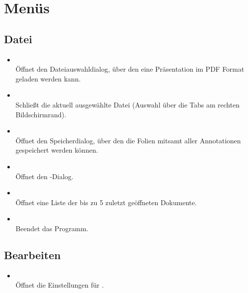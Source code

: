 \section{Menüs}
\subsection{Datei}
\begin{itemize}
\item {}\\Öffnet den Dateiauswahldialog, über den eine Präsentation im PDF Format geladen werden kann.
\item {}\\Schließt die aktuell ausgewählte Datei (Auswahl über die Tabs am rechten Bildschirmrand).
\item {}\\Öffnet den Speicherdialog, über den die Folien mitsamt aller Annotationen gespeichert werden können.
\item {}\\Öffnet den -Dialog.
\item {}\\Öffnet eine Liste der bis zu 5 zuletzt geöffneten Dokumente.
\item {}\\Beendet das Programm.
\end{itemize}
\subsection{Bearbeiten}
\begin{itemize}
\item {}\\Öffnet die Einstellungen für \lectPresenter{}.
\end{itemize}
